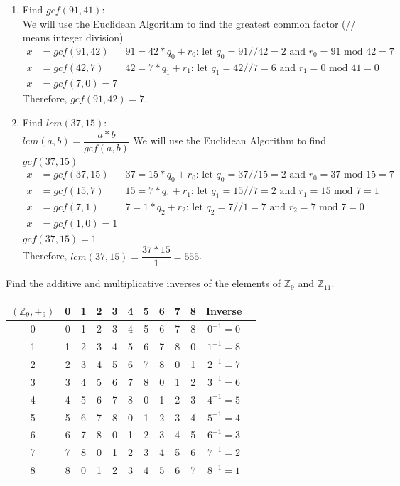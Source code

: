 \documentclass{article}
\begin{document}
\begin{enumerate}[3.1]
	\item Find $gcf(91,41)$: \\
	We will use the Euclidean Algorithm to find the greatest common factor (// means integer division)
	\begin{align*}
		x &= gcf(91,42)	&91=42*q_0+r_0 \text{: let $q_0=91//42=2$ and $r_0=91$ mod $42=7$} \\
		x &= gcf(42,7) &42=7*q_1+r_1 \text{: let $q_1=42//7=6$ and $r_1=0$ mod $41=0$} \\
		x &= gcf(7,0)=7
	\end{align*}
	Therefore, $gcf(91,42)=7$.
	\item Find $lcm(37,15)$: \\
	$lcm(a,b)=\dfrac{a*b}{gcf(a,b)}$
	We will use the Euclidean Algorithm to find $gcf(37,15)$
	\begin{align*}
		x &= gcf(37,15) &37=15*q_0+r_0 \text{: let $q_0=37//15=2$ and $r_0=37$ mod $15=7$} \\
		x &= gcf(15,7) &15=7*q_1+r_1 \text{: let $q_1=15//7=2$ and $r_1=15$ mod $7=1$} \\
		x &= gcf(7,1) &7=1*q_2+r_2 \text{: let $q_2=7//1=7$ and $r_2=7$ mod $7=0$} \\
		x &= gcf(1,0)=1
	\end{align*}
	$gcf(37,15)=1$ \\
	Therefore, $lcm(37,15)=\dfrac{37*15}{1}=555$.
\end{enumerate}

\clearpage
\header

Find the additive and multiplicative inverses of the elements of $\mathbb{Z}_9$ and $\mathbb{Z}_{11}$.

\begin{center}
	\begin{tabular}{ |c|c|c|c|c|c|c|c|c|c|c|c| } 
		\hline
		$(\mathbb{Z}_9,+_9)$  & 0 & 1 & 2 & 3 & 4 & 5 & 6 & 7 & 8 & Inverse \\
		\hline
		0 & 0 & 1 & 2 & 3 & 4 & 5 & 6 & 7 & 8 & $0^{-1}=0$ \\
		1 & 1 & 2 & 3 & 4 & 5 & 6 & 7 & 8 & 0 & $1^{-1}=8$ \\
		2 & 2 & 3 & 4 & 5 & 6 & 7 & 8 & 0 & 1 & $2^{-1}=7$ \\
		3 & 3 & 4 & 5 & 6 & 7 & 8 & 0 & 1 & 2 & $3^{-1}=6$ \\
		4 & 4 & 5 & 6 & 7 & 8 & 0 & 1 & 2 & 3 & $4^{-1}=5$ \\
		5 & 5 & 6 & 7 & 8 & 0 & 1 & 2 & 3 & 4 & $5^{-1}=4$ \\
		6 & 6 & 7 & 8 & 0 & 1 & 2 & 3 & 4 & 5 & $6^{-1}=3$ \\
		7 & 7 & 8 & 0 & 1 & 2 & 3 & 4 & 5 & 6 & $7^{-1}=2$ \\
		8 & 8 & 0 & 1 & 2 & 3 & 4 & 5 & 6 & 7 & $8^{-1}=1$ \\
		\hline
	\end{tabular}
\end{center}
\end{document}
